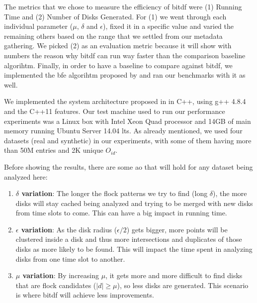 {The metrics that we chose to measure the efficiency of \ac{bitdf} were (1) Running Time and (2) Number of Disks
Generated. For (1) we went through each individual parameter ($\mu$, $\delta$ and $\epsilon$), fixed it in a specific
value and varied the remaining others based on the range that we settled from our metadata gathering. We picked (2) as
an evaluation metric because it will show with numbers the reason why \ac{bitdf} can run way faster than the comparison
baseline algorihtm. Finally, in order to have a baseline to compare against \ac{bitdf}, we implemented the \ac{bfe}
algorihtm proposed by  and ran our benchmarks with it as well.

We implemented the system architecture proposed in  in C++, using g++ 4.8.4 and the C++11
\cite{cpp11spec} features. Our test machine used to run our performance experiments was a Linux box with Intel Xeon
Quad processor and 14GB of main memory running Ubuntu Server 14.04 \ac{lts}. As already mentioned, we used four datasets
(real and synthetic) in our experiments, with some of them having more than 50M entries and 2K unique $O_{id}$.

Before showing the results, there are some \ac{ao} that will hold for any dataset being analyzed here:

\begin{enumerate}
    \item \textbf{$\delta$ variation}: The longer the flock patterns we try to find (long $\delta$), the more disks will
        stay cached being analyzed and trying to be merged with new disks from time slots to come. This can have a big
        impact in running time.\label{sssec:lvariation}

    \item \textbf{$\epsilon$ variation}: As the disk radius ($\epsilon / 2$) gets bigger, more points will be clustered
        inside a disk and thus more intersections and duplicates of those disks as more likely to be found. This will
        impact the time spent in analyzing disks from one time slot to another.\label{sssec:gvariation}

    \item \textbf{$\mu$ variation}: By increasing $\mu$, it gets more and more difficult to find disks that are flock
        candidates ($|d| \ge \mu$), so less disks are generated. This scenario is where \ac{bitdf} will achieve less
        improvements. \label{sssec:nvariation}
\end{enumerate}

}
